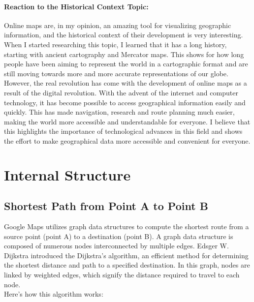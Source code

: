 \documentclass[10pt,oneside,english,a4paper]{article}
\begin{document}
\paragraph{Reaction to the Historical Context Topic:}
Online maps are, in my opinion, an amazing tool for visualizing geographic information, and the historical context of their development is very interesting. When I started researching this topic, I learned that it has a long history, starting with ancient cartography and Mercator maps. This shows for how long people have been aiming to represent the world in a cartographic format and are still moving towards more and more accurate representations of our globe.
\\However, the real revolution has come with the development of online maps as a result of the digital revolution. With the advent of the internet and computer technology, it has become possible to access geographical information easily and quickly. This has made navigation, research and route planning much easier, making the world more accessible and understandable for everyone. I believe that this highlights the importance of technological advances in this field and shows the effort to make geographical data more accessible and convenient for everyone.


\section{Internal Structure} \label{internal}

\subsection{Shortest Path from Point A to Point B} \label{internal:dijikstra}
Google Maps utilizes graph data structures to compute the shortest route from a source point (point A) to a destination (point B). A graph data structure is composed of numerous nodes interconnected by multiple edges. Edsger W. Dijkstra introduced the Dijkstra's algorithm, an efficient method for determining the shortest distance and path to a specified destination. In this graph, nodes are linked by weighted edges, which signify the distance required to travel to each node. 
\\Here's how this algorithm works\cite{Mehta2019}:
\end{document}
